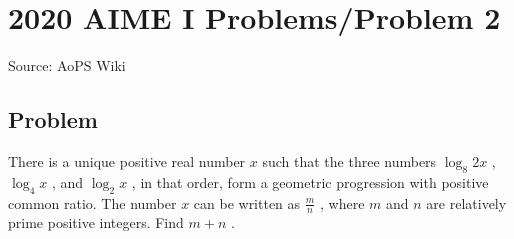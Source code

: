 \documentclass[12pt]{article}
\begin{document}
\section*{{2020 AIME I Problems/Problem 2}}
Source: AoPS Wiki

\subsection*{Problem}
There is a unique positive real number $x$ such that the three numbers $\log_8{2x}$ , $\log_4{x}$ , and $\log_2{x}$ , in that order, form a geometric progression with positive common ratio. The number $x$ can be written as $\frac{m}{n}$ , where $m$ and $n$ are relatively prime positive integers. Find $m + n$ .
\end{document}
